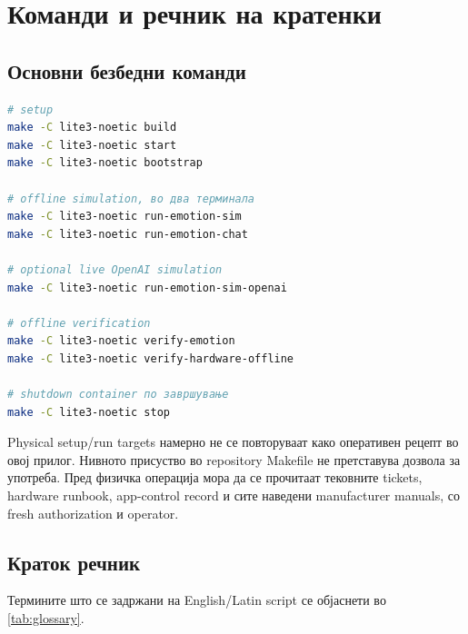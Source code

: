 \chapter{Команди и речник на кратенки}
\label{app:commands}

\section{Основни безбедни команди}

\begin{lstlisting}[language=bash,caption={Build, run и verification summary}]
# setup
make -C lite3-noetic build
make -C lite3-noetic start
make -C lite3-noetic bootstrap

# offline simulation, во два терминала
make -C lite3-noetic run-emotion-sim
make -C lite3-noetic run-emotion-chat

# optional live OpenAI simulation
make -C lite3-noetic run-emotion-sim-openai

# offline verification
make -C lite3-noetic verify-emotion
make -C lite3-noetic verify-hardware-offline

# shutdown container по завршување
make -C lite3-noetic stop
\end{lstlisting}

Physical setup/run targets намерно не се повторуваат како оперативен рецепт во
овој прилог. Нивното присуство во repository Makefile не претставува дозвола
за употреба. Пред физичка операција мора да се прочитаат тековните tickets,
hardware runbook, app-control record и сите наведени manufacturer manuals, со
fresh authorization и operator.

\section{Краток речник}

Термините што се задржани на English/Latin script се објаснети во
\cref{tab:glossary}.

